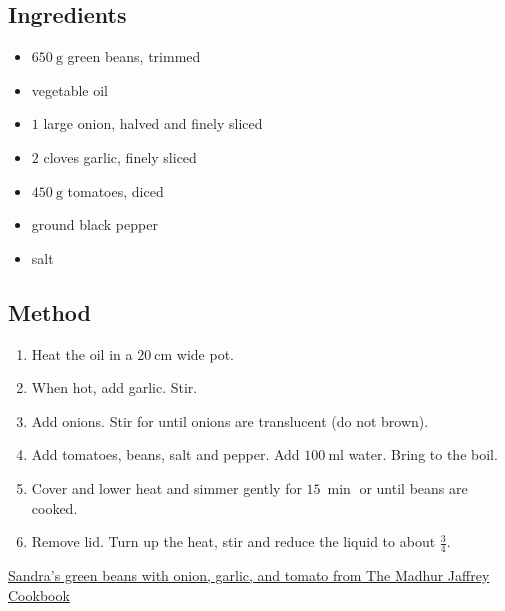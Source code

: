 \documentclass[11pt,a4paper]{article}
\begin{document}
\subsection*{Ingredients}

\begin{itemize}
  \item $ \qty{650}{\gram} $ green beans, trimmed
  \item vegetable oil
  \item $ 1 $ large onion, halved and finely sliced
  \item $ 2 $ cloves garlic, finely sliced
  \item $ \qty{450}{\gram} $ tomatoes, diced
  \item ground black pepper
  \item salt
\end{itemize}

\medskip

\subsection*{Method}

\begin{enumerate}
  \item Heat the oil in a $ \qty{20}{\cm} $ wide pot.
  \item When hot, add garlic. Stir. 
  \item Add onions. Stir for until onions are translucent (do not brown).
  \item Add tomatoes, beans, salt and pepper. Add $ \qty{100}{\ml} $ water. Bring to the boil.
  \item Cover and lower heat and simmer gently for $ \qty{15}{\min} $ or until beans are cooked.
  \item Remove lid. Turn up the heat, stir and reduce the liquid to about $ \frac{3}{4} $.
\end{enumerate}

\href{https://www.eatyourbooks.com/library/recipes/66673/sandras-green-beans-with-onion}{Sandra's green beans with onion, garlic, and tomato from The Madhur Jaffrey Cookbook}
\end{document}
